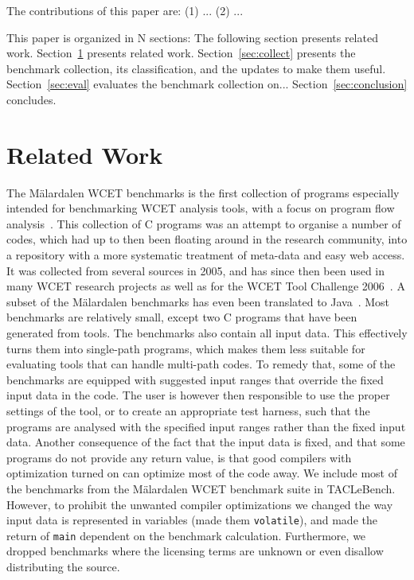 \documentclass[a4paper,UKenglish]{oasics}
\newcommand{\code}[1]{{\small{\texttt{#1}}}}
\begin{document}
The contributions of this paper are: (1) ... (2) ...

This paper is organized in N sections: The following section presents related work.
Section~\ref{sec:related} presents related work.
Section~\ref{sec:collect} presents the benchmark collection, its classification, and the updates
to make them useful.
Section~\ref{sec:eval} evaluates the benchmark collection on...
Section~\ref{sec:conclusion} concludes.

\section{Related Work}
\label{sec:related}

The M{\"a}lardalen WCET benchmarks is the first collection of programs especially
intended for benchmarking WCET analysis tools, with a focus on program flow analysis~\cite{wcet:bench:2012}.
This collection of C programs was an attempt to organise a number of codes, which had up to then been floating around
in the research community, into a repository with a more systematic treatment of meta-data and easy web access.
It was collected from several sources in 2005, and has since then been
used in many WCET research projects as well as for the WCET Tool Challenge 2006~\cite{Gustafsson:ISOLA2006}.
A subset of the M{\"a}lardalen benchmarks has even been translated to
Java~\cite{jop:volta:rtas2008}. Most benchmarks are relatively small, except
two C programs that have been generated from tools. The benchmarks also
contain all input data. This effectively turns them into single-path programs, which
makes them less suitable for evaluating tools that can handle multi-path codes. To remedy that,
some of the benchmarks are equipped with suggested input ranges that override the fixed
input data in the code. The user is however then responsible to use the proper settings of the tool,
or to create an appropriate test harness, such that the programs are analysed with the specified input ranges
rather than the fixed input data. Another consequence of the fact that the
input data is fixed, and that some programs do not provide
any return value, is that good compilers with optimization turned on can optimize
most of the code away. We include most of the benchmarks from the
 M{\"a}lardalen WCET benchmark suite in TACLeBench. However, to prohibit the unwanted compiler optimizations we changed
 the way input data is represented in variables (made them \code{volatile}),
 and made the return of \code{main} dependent on the benchmark calculation.
 Furthermore, we dropped benchmarks where the licensing terms are unknown
 or even disallow distributing the source.
\end{document}
